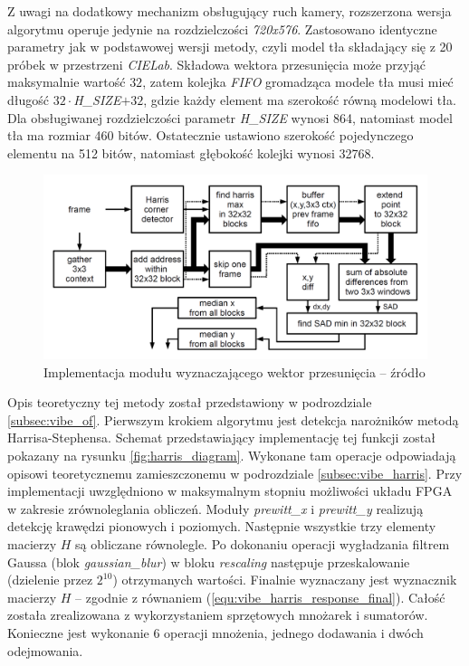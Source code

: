 Z uwagi na dodatkowy mechanizm obsługujący ruch kamery, rozszerzona wersja algorytmu operuje jedynie na rozdzielczości \textit{720x576}. %
Zastosowano identyczne parametry jak w podstawowej wersji metody, czyli model tła składający się z 20 próbek w przestrzeni \textit{CIELab}.
Składowa wektora przesunięcia może przyjąć maksymalnie wartość $32$, zatem kolejka \textit{FIFO} gromadząca modele tła musi mieć długość $32 \cdot$\textit{\small{H\_SIZE}}$+32$, gdzie każdy element ma szerokość równą modelowi tła. 
Dla obsługiwanej rozdzielczości parametr \textit{\small{H\_SIZE}} wynosi 864, natomiast model tła ma rozmiar 460 bitów. Ostatecznie ustawiono szerokość pojedynczego elementu na 512 bitów, natomiast głębokość kolejki wynosi 32768.  

	\begin{figure}[h!]
		\centering
		\includegraphics[scale=0.25]{img/4/displacement_vector_diagram.png}
		\caption{Implementacja modułu wyznaczającego wektor przesunięcia -- źródło \cite{kryjak_14_vibe}} %
		\label{fig:displacement_diagram}
	\end{figure}

Opis teoretyczny tej metody został przedstawiony w podrozdziale \ref{subsec:vibe_of}. 
Pierwszym krokiem algorytmu jest detekcja narożników metodą Harrisa-Stephensa. 
Schemat przedstawiający implementację tej funkcji został pokazany na rysunku \ref{fig:harris_diagram}. 
Wykonane tam operacje odpowiadają opisowi teoretycznemu zamieszczonemu w podrozdziale \ref{subsec:vibe_harris}. 
Przy implementacji uwzględniono w maksymalnym stopniu możliwości układu FPGA w zakresie zrównoleglania obliczeń. 
Moduły \textit{prewitt\_x} i \textit{prewitt\_y} realizują detekcję krawędzi pionowych i poziomych. 
Następnie wszystkie trzy elementy macierzy $H$ są obliczane równolegle. 
Po dokonaniu operacji wygładzania filtrem Gaussa (blok \textit{gaussian\_blur}) w bloku \textit{rescaling} następuje przeskalowanie (dzielenie przez $2^{10}$) otrzymanych wartości. 
Finalnie wyznaczany jest wyznacznik macierzy $H$ -- zgodnie z równaniem (\ref{equ:vibe_harris_response_final}). 
Całość została zrealizowana z wykorzystaniem sprzętowych mnożarek i sumatorów. 
Konieczne jest wykonanie 6 operacji mnożenia, jednego dodawania i dwóch odejmowania.
 
